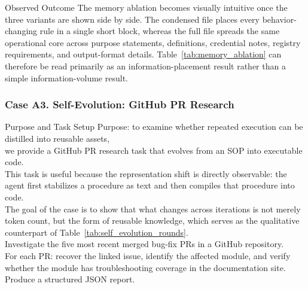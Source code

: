 \begin{CaseAnswerBox}{Observed Outcome}
The memory ablation becomes visually intuitive once the three variants are shown side by side.
The condensed file places every behavior-changing rule in a single short block, whereas the full file spreads the same operational core across purpose statements, definitions, credential notes, registry requirements, and output-format details.
Table~\ref{tab:memory_ablation} can therefore be read primarily as an information-placement result rather than a simple information-volume result.
\end{CaseAnswerBox}

\FloatBarrier

\subsubsection{Case A3. Self-Evolution: GitHub PR Research}
\label{app:case_self_evolution}

\begin{CasePromptBox}{Purpose and Task Setup}
\small\ttfamily
Purpose: to examine whether repeated execution can be distilled into reusable assets, \\
we provide a GitHub PR research task that evolves from an SOP into executable code. \\
This task is useful because the representation shift is directly observable: the agent first stabilizes a procedure as text and then compiles that procedure into code. \\
The goal of the case is to show that what changes across iterations is not merely token count, but the form of reusable knowledge, which serves as the qualitative counterpart of Table~\ref{tab:self_evolution_rounds}. \\
Investigate the five most recent merged bug-fix PRs in a GitHub repository. \\
For each PR: recover the linked issue, identify the affected module, and verify whether the module has troubleshooting coverage in the documentation site. \\
Produce a structured JSON report.
\end{CasePromptBox}

